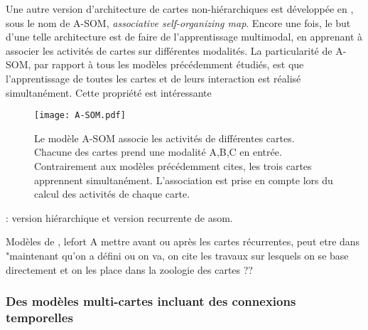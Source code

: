 \documentclass[../main]{subfiles}
\begin{document}
Une autre version d'architecture de cartes non-hiérarchiques est développée en \cite{johnsson_associating_2008}, sous le nom de A-SOM, \emph{associative self-organizing map}. Encore une fois, le but d'une telle architecture est de faire de l'apprentissage multimodal, en apprenant à associer les activités de cartes sur différentes modalités.
La particularité de A-SOM, par rapport à tous les modèles précédemment étudiés, est que l'apprentissage de toutes les cartes et de leurs interaction est réalisé simultanément. 
Cette propriété est intéressante
\begin{figure}
    \centering\texttt{[image: A-SOM.pdf]}
    \caption{Le modèle A-SOM \cite{johnsson_associating_2008} associe les activités de différentes cartes. Chacune des cartes prend une modalité A,B,C en entrée. Contrairement aux modèles précédemment cites, les trois cartes apprennent simultanément. L'association est prise en compte lors du calcul des activités de chaque carte.\label{fig:asom}}
\end{figure}
\cite{buonamente_hierarchies_2016,Buonamente2013SimulatingAW}: version hiérarchique et version recurrente de asom.



Modèles de \cite{khouzam,menard05}, lefort
A mettre avant ou après les cartes récurrentes, peut etre dans "maintenant qu'on a défini ou on va, on cite les travaux sur lesquels on se base directement et on les place dans la zoologie des cartes ??

\subsubsection{Des modèles multi-cartes incluant des connexions temporelles}
\end{document}
